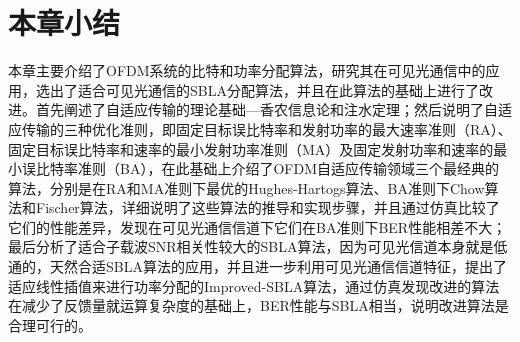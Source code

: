 \section{本章小结}
本章主要介绍了OFDM系统的比特和功率分配算法，研究其在可见光通信中的应用，选出了适合可见光通信的SBLA分配算法，并且在此算法的基础上进行了改进。首先阐述了自适应传输的理论基础—香农信息论和注水定理；然后说明了自适应传输的三种优化准则，即固定目标误比特率和发射功率的最大速率准则（RA）、固定目标误比特率和速率的最小发射功率准则（MA）及固定发射功率和速率的最小误比特率准则（BA），在此基础上介绍了OFDM自适应传输领域三个最经典的算法，分别是在RA和MA准则下最优的Hughes-Hartogs算法、BA准则下Chow算法和Fischer算法，详细说明了这些算法的推导和实现步骤，并且通过仿真比较了它们的性能差异，发现在可见光通信信道下它们在BA准则下BER性能相差不大；最后分析了适合子载波SNR相关性较大的SBLA算法，因为可见光信道本身就是低通的，天然合适SBLA算法的应用，并且进一步利用可见光通信信道特征，提出了适应线性插值来进行功率分配的Improved-SBLA算法，通过仿真发现改进的算法在减少了反馈量就运算复杂度的基础上，BER性能与SBLA相当，说明改进算法是合理可行的。
